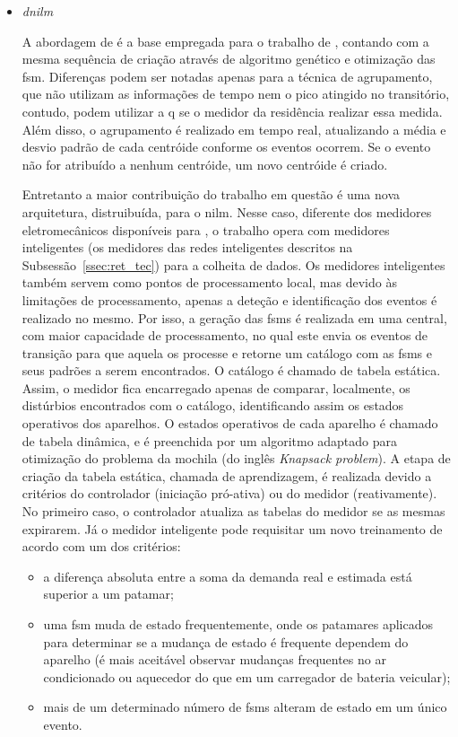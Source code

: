 \begin{enumerate}[label=\textbf{1.\arabic*},wide=\parindent]
\begin{enumerate}[label*=.\textbf{\arabic*},wide=\parindent]
\begin{itemize}[wide=\parindent]
\item \emph{\gls{dnilm}}

A abordagem de \citeauthor*{nilm_baranski_summary_2004_21} é a base
empregada para o trabalho de \citet*{nilm_bergman_distribuido_2011},
contando com a mesma sequência de criação através de algoritmo
genético e otimização das \gls{fsm}. Diferenças podem ser notadas
apenas para a técnica de agrupamento, que não utilizam as informações
de tempo nem o pico atingido no transitório, contudo, podem utilizar a
\gls{q} se o medidor da residência realizar essa medida. Além disso, o
agrupamento é realizado em tempo real, atualizando a média e desvio
padrão de cada centróide conforme os eventos ocorrem. Se o evento não
for atribuído a nenhum centróide, um novo centróide é criado. 

Entretanto a maior contribuição do trabalho
em questão é uma nova arquitetura, distruibuída, para o \gls{nilm}.
Nesse caso, diferente dos medidores eletromecânicos disponíveis para
\citeauthor*{nilm_baranski_summary_2004_21}, o trabalho opera com
medidores inteligentes (os medidores das redes inteligentes descritos
na Subsessão~\ref{ssec:ret_tec}) para a colheita de
dados. Os medidores inteligentes também servem como pontos de
processamento local, mas devido às limitações de processamento, apenas
a deteção e identificação dos eventos é realizado no mesmo. Por isso,
a geração das \glspl{fsm} é realizada em uma central, com maior
capacidade de processamento, no qual este envia os eventos de
transição para que aquela os processe e retorne um catálogo com as
\glspl{fsm} e seus padrões a serem encontrados. O catálogo é chamado
de tabela estática. Assim, o medidor fica encarregado apenas de
comparar, localmente, os distúrbios encontrados com o catálogo,
identificando assim os estados operativos dos aparelhos. O estados
operativos de cada aparelho é chamado de tabela dinâmica, e é
preenchida por um algoritmo adaptado para otimização do problema da
mochila (do inglês \emph{Knapsack problem}). A etapa de criação da
tabela estática, chamada de aprendizagem, é realizada devido a
critérios do controlador (iniciação pró-ativa) ou do medidor
(reativamente). No primeiro caso, o controlador atualiza as tabelas do
medidor se as mesmas expirarem. Já o medidor inteligente pode
requisitar um novo treinamento de acordo com um dos critérios:

\begin{itemize}
\item a diferença absoluta entre a soma da demanda real e estimada
está superior a um patamar;
\item uma \gls{fsm} muda de estado frequentemente, onde os patamares
aplicados para determinar se a mudança de estado é frequente dependem
do aparelho (é mais aceitável observar mudanças frequentes no ar
condicionado ou aquecedor do que em um carregador de bateria
veicular);
\item mais de um determinado número de \glspl{fsm} alteram de estado
em um único evento.
\end{itemize}


\end{itemize}
\end{enumerate}
\end{enumerate}
